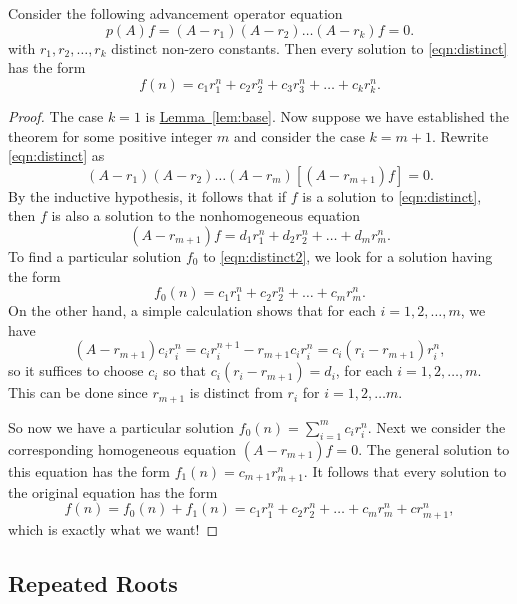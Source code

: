 \begin{theorem}
Consider the following advancement operator equation
\begin{equation}\label{eqn:distinct}
p(A)f=(A-r_1)(A-r_2)\dots(A-r_k)f=0.
\end{equation}
with $r_1,r_2,\dots,r_k$ distinct non-zero constants.
Then every solution
to \autoref{eqn:distinct} has the form
\[
f(n)=c_1r_1^n+c_2 r_2^n+c_3r_3^n+\dots+c_kr_k^n.
\]
\end{theorem}
\begin{proof}
  The case $k=1$ is \hyperref[lem:base]{Lemma~\ref*{lem:base}}.  Now
  suppose we have established the theorem for some positive integer
  $m$ and consider the case $k=m+1$. Rewrite \autoref{eqn:distinct} as
  \[
  (A-r_1)(A-r_2)\dots(A-r_m)[(A-r_{m+1})f]=0.
  \]
  By the inductive hypothesis, it follows that if $f$ is a solution to
  \autoref{eqn:distinct}, then $f$ is also a solution to the
  nonhomogeneous equation
  \begin{equation}\label{eqn:distinct2}
    (A-r_{m+1})f=d_1r_1^n+d_2r_2^n+\dots+d_mr_m^n.
  \end{equation}
  To find a particular solution $f_0$ to \autoref{eqn:distinct2},
  we look for a solution having the form
  \begin{equation}\label{eqn:distinct3}
    f_0(n)= c_1 r_1^n+c_2 r_2^n+\dots+c_m r_m^n.
  \end{equation}
  On the other hand, a simple calculation shows that for each
  $i=1,2,\dots,m$, we have
  \[
  (A-r_{m+1})c_i r_i^n=c_i r_i^{n+1}-r_{m+1}c_i r_i^n=c_i (r_i-r_{m+1})r_i^n,
  \]
  so it suffices to choose $c_i$ so that $c_i(r_i-r_{m+1})=d_i$, for each
  $i=1,2,\dots,m$. This can be done since $r_{m+1}$ is distinct from
  $r_i$ for $i=1,2,\dots m$.

  So now we have a particular solution $f_0(n)=\sum_{i=1}^{m} c_i
  r_i^n$.  Next we consider the corresponding homogeneous equation
  $(A-r_{m+1})f=0$.  The general solution to this equation has the
  form $f_1(n)=c_{m+1}r_{m+1}^n$.  It follows that every solution to
  the original equation has the form
  \[
  f(n)=f_0(n)+f_1(n) = c_1r_1^n+c_2r_2^n+\dots+c_m r_m^n+cr_{m+1}^n,
  \]
  which is exactly what we want!
\end{proof}

\subsection{Repeated Roots}\label{s:recurrence:rigorous:repeated}

